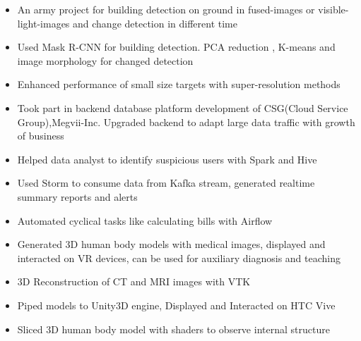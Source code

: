 \documentclass{resume}
\begin{document}
\begin{itemize}[topsep = 0 pt, partopsep = 0pt]
  \item An army project for building detection on ground in fused-images or visible-light-images and change detection in different time
  \item Used Mask R-CNN for building detection. PCA reduction , K-means and image morphology for changed detection
  \item Enhanced performance of small size targets with super-resolution methods 
\end{itemize}

\begin{itemize}[topsep = 0 pt, partopsep = 0pt]
  \item Took part in backend database platform development of CSG(Cloud Service Group),Megvii-Inc. Upgraded backend to adapt large data traffic with growth of business
  \item Helped data analyst to identify suspicious users with Spark and Hive
  \item Used Storm to consume data from Kafka stream, generated realtime summary reports and alerts
  \item Automated cyclical tasks like calculating bills with Airflow 
\end{itemize}

\begin{itemize}[topsep = 0 pt, partopsep = 0pt]
  \item Generated 3D human body models with medical images, displayed and interacted on VR devices, can be used for auxiliary diagnosis and teaching
  \item 3D Reconstruction of CT and MRI images with VTK
  \item Piped models to Unity3D engine, Displayed and Interacted on HTC Vive
  \item Sliced 3D human body model with shaders to observe internal structure
\end{itemize}
\end{document}
